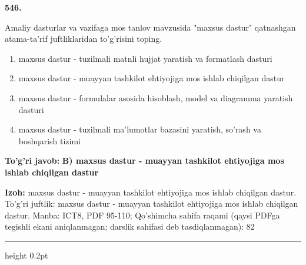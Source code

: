 \documentclass[10pt,a4paper]{article}
\begin{document}
{\bfseries\sffamily\color{ink} 546.}
\par
Amaliy dasturlar va vazifaga mos tanlov mavzusida "maxsus dastur" qatnashgan atama-ta'rif juftliklaridan to'g'risini toping.
\begin{enumerate}[label=\Alph*),leftmargin=9mm]
\item maxsus dastur - tuzilmali matnli hujjat yaratish va formatlash dasturi
\item maxsus dastur - muayyan tashkilot ehtiyojiga mos ishlab chiqilgan dastur
\item maxsus dastur - formulalar asosida hisoblash, model va diagramma yaratish dasturi
\item maxsus dastur - tuzilmali ma'lumotlar bazasini yaratish, so'rash va boshqarish tizimi
\end{enumerate}
\begin{tcolorbox}[enhanced,breakable,colback=teal!4,colframe=teal!60!black,boxrule=0.45pt,arc=1.2mm,left=2.7mm,right=2.7mm,top=1.8mm,bottom=1.8mm,before skip=2mm,after skip=2mm]
{\bfseries\sffamily\color{teal}To'g'ri javob:} \textbf{B) maxsus dastur - muayyan tashkilot ehtiyojiga mos ishlab chiqilgan dastur}
\par\smallskip
{\bfseries Izoh:} maxsus dastur - muayyan tashkilot ehtiyojiga mos ishlab chiqilgan dastur. To'g'ri juftlik: maxsus dastur - muayyan tashkilot ehtiyojiga mos ishlab chiqilgan dastur. Manba: ICT8, PDF 95-110; Qo'shimcha sahifa raqami (qaysi PDFga tegishli ekani aniqlanmagan; darslik sahifasi deb tasdiqlanmagan): 82
\end{tcolorbox}
\vspace{2mm}\hrule height 0.2pt\vspace{3mm}
\end{document}
